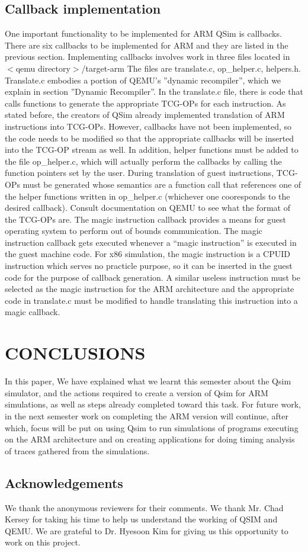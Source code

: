 \documentclass[letterpaper,10pt,twocolumn]{article}
\begin{document}
\subsection{Callback implementation}
One important functionality to be implemented for ARM QSim is callbacks. There are six callbacks to be implemented for ARM and they are listed in the previous section. Implementing callbacks involves work in three files located in
$<$qemu directory$>$/target-arm The files are translate.c, op\_helper.c, helpers.h. Translate.c embodies a portion of QEMU’s ''dynamic recompiler'', which we explain in section ''Dynamic Recompiler''. In the translate.c file, there is code that calls functions to generate the appropriate TCG-OPs for each instruction. As stated before, the creators of QSim already implemented translation of ARM instructions into TCG-OPs. However, callbacks have not been implemented, so the code needs to be modified so that the appropriate callbacks will be inserted into the TCG-OP stream as well. In addition, helper functions must be added to the file op\_helper.c, which will actually perform the callbacks by calling the  function pointers set by the user. During translation of guest instructions, TCG-OPs must be generated whose semantics are a function call that references one of the helper functions written in op\_helper.c (whichever one cooresponds to the desired callback). Consult documentation on QEMU to see what the format of the TCG-OPs are.
The magic instruction callback provides a means for guest operating system to perform out of bounds communication. The magic instruction callback gets executed whenever a “magic instruction” is executed in the guest machine code. For x86 simulation, the magic instruction is a CPUID instruction which serves no practicle purpose, so it can be inserted in the guest code for the purpose of callback generation. A similar useless instruction must be selected as the magic instruction for the ARM architecture and the appropriate code in translate.c must be modified to handle translating this instruction into a magic callback.
\section{CONCLUSIONS}
In this paper, We have explained what we learnt this semester about the Qsim simulator, and the actions required to create a version of Qsim for ARM simulations, as well as steps already completed toward this task. For future work, in the next semester work on completing the ARM version will continue, after which, focus will be put on using Qsim to run simulations of programs executing on the ARM architecture and on creating applications for doing timing analysis of traces gathered from the simulations.
\subsection{Acknowledgements}
We thank the anonymous reviewers for their comments. We thank Mr. Chad Kersey for taking his time to help us understand the working of QSIM and QEMU. We are grateful to Dr. Hyesoon Kim for giving us this opportunity to work on this project.
\end{document}
